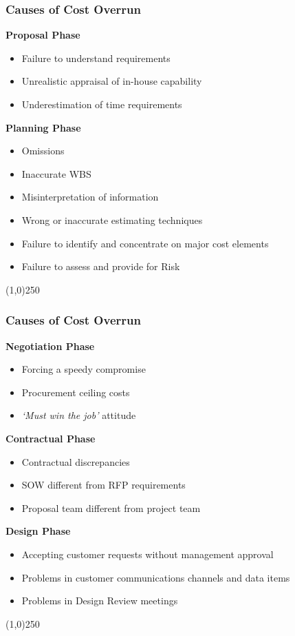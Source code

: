 \begin{frame}
\frametitle{Causes of Cost Overrun}
\textbf{Proposal Phase}
\begin{itemize}
	\item Failure to understand requirements
	\item Unrealistic appraisal of in-house capability
	\item Underestimation of time requirements
\end{itemize}
\textbf{Planning Phase}
\begin{itemize}
	\item Omissions
	\item Inaccurate WBS
	\item Misinterpretation of information
	\item Wrong or inaccurate estimating techniques
	\item Failure to identify and concentrate on major cost elements
	\item Failure to assess and provide for Risk
\end{itemize}
\end{frame}
\begin{center}\line(1,0){250}\end{center}






\begin{frame}
\frametitle{Causes of Cost Overrun}
\textbf{Negotiation Phase}
\begin{itemize}
	\item Forcing a speedy compromise
	\item Procurement ceiling costs
	\item \textit{‘Must win the job’} attitude
\end{itemize}
\textbf{Contractual Phase}
\begin{itemize}
	\item Contractual discrepancies
	\item SOW different from RFP requirements
	\item Proposal team different from project team
\end{itemize}
\textbf{Design Phase}
\begin{itemize}
	\item Accepting customer requests without management approval
	\item Problems in customer communications channels and data items
	\item Problems in Design Review meetings
\end{itemize}
\end{frame}
\begin{center}\line(1,0){250}\end{center}






